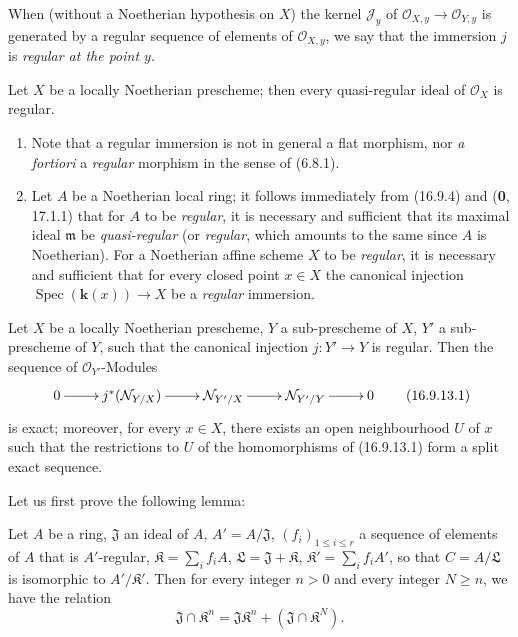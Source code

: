 When (without a Noetherian hypothesis on $X$) the kernel $\mathscr{J}_y$ of
$\mathcal{O}_{X,y}\to\mathcal{O}_{Y,y}$ is generated by a regular sequence
of elements of $\mathcal{O}_{X,y}$, we say that the immersion $j$ is
\emph{regular at the point $y$}.

\begin{corollary}[16.9.11]
\label{IV.16.9.11}
Let $X$ be a locally Noetherian prescheme; then every quasi-regular ideal of
$\mathcal{O}_X$ is regular.
\end{corollary}

\begin{remarks}[16.9.12]
\label{IV.16.9.12}
\begin{enumerate}
  \item[(i)] Note that a regular immersion is not in general a flat
  morphism, nor \emph{a fortiori} a \emph{regular} morphism in the sense of
  (6.8.1).
  \item[(ii)] Let $A$ be a Noetherian local ring; it follows immediately from
  (16.9.4) and (\textbf{0}, 17.1.1) that for $A$ to be \emph{regular}, it is
  necessary and sufficient that its maximal ideal $\mathfrak{m}$ be
  \emph{quasi-regular} (or \emph{regular}, which amounts to the same since $A$
  is Noetherian). For a Noetherian affine scheme $X$ to be \emph{regular}, it
  is necessary and sufficient that for every closed point $x\in X$ the
  canonical injection $\operatorname{Spec}(\boldsymbol{k}(x))\to X$ be a \emph{regular}
  immersion.
\end{enumerate}
\end{remarks}

\begin{proposition}[16.9.13]
\label{IV.16.9.13}
Let $X$ be a locally Noetherian prescheme, $Y$ a sub-prescheme of $X$,
$Y'$ a sub-prescheme of $Y$, such that the canonical injection $j:Y'\to Y$ is
regular. Then the sequence of $\mathcal{O}_{Y'}$-Modules
\[
  \xymatrix{
    0\ar[r] & j^*(\mathcal{N}_{Y/X})\ar[r]
      & \mathcal{N}_{Y'/X}\ar[r] & \mathcal{N}_{Y'/Y}\ar[r] & 0
  }
  \tag{16.9.13.1}
  \label{IV.16.9.13.1}
\]
is exact; moreover, for every $x\in X$, there exists an open neighbourhood $U$
of $x$ such that the restrictions to $U$ of the homomorphisms of (16.9.13.1)
form a split exact sequence.
\end{proposition}

Let us first prove the following lemma:

\begin{lemma}[16.9.13.2]
\label{IV.16.9.13.2}
Let $A$ be a ring, $\mathfrak{J}$ an ideal of $A$,
$A'=A/\mathfrak{J}$, $(f_i)_{1\leq i\leq r}$ a sequence of elements of $A$
that is $A'$-regular, $\mathfrak{K}=\sum_i f_iA$,
$\mathfrak{L}=\mathfrak{J}+\mathfrak{K}$,
$\mathfrak{K}'=\sum_i f_iA'$, so that $C=A/\mathfrak{L}$ is isomorphic to
$A'/\mathfrak{K}'$. Then for every integer $n>0$ and every integer $N\geq n$,
we have the relation
\[
  \mathfrak{J}\cap\mathfrak{K}^n
  =\mathfrak{J}\mathfrak{K}^n+(\mathfrak{J}\cap\mathfrak{K}^N).
  \tag{16.9.13.3}
  \label{IV.16.9.13.3}
\]
\end{lemma}

